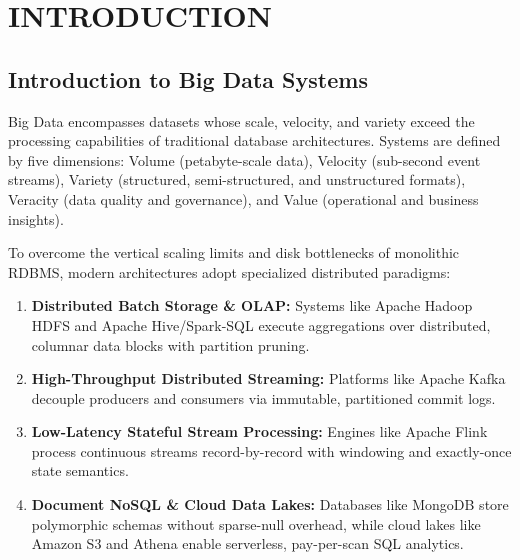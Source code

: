\documentclass[12pt,a4paper]{report}
\begin{document}
\clearpage

\tableofcontents
\clearpage
\listoffigures
{}
\clearpage
\listoftables
{}
\clearpage

\setcounter{page}{1}

\chapter{INTRODUCTION}

\section{Introduction to Big Data Systems}
Big Data encompasses datasets whose scale, velocity, and variety exceed the processing capabilities of traditional database architectures. Systems are defined by five dimensions: Volume (petabyte-scale data), Velocity (sub-second event streams), Variety (structured, semi-structured, and unstructured formats), Veracity (data quality and governance), and Value (operational and business insights).

To overcome the vertical scaling limits and disk bottlenecks of monolithic RDBMS, modern architectures adopt specialized distributed paradigms:
\begin{enumerate}
    \item \textbf{Distributed Batch Storage \& OLAP:} Systems like Apache Hadoop HDFS and Apache Hive/Spark-SQL execute aggregations over distributed, columnar data blocks with partition pruning.
    \item \textbf{High-Throughput Distributed Streaming:} Platforms like Apache Kafka decouple producers and consumers via immutable, partitioned commit logs.
    \item \textbf{Low-Latency Stateful Stream Processing:} Engines like Apache Flink process continuous streams record-by-record with windowing and exactly-once state semantics.
    \item \textbf{Document NoSQL \& Cloud Data Lakes:} Databases like MongoDB store polymorphic schemas without sparse-null overhead, while cloud lakes like Amazon S3 and Athena enable serverless, pay-per-scan SQL analytics.
\end{enumerate}
\end{document}

